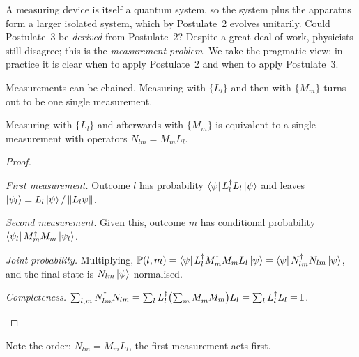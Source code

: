 \begin{remark}
  A measuring device is itself a quantum system, so the system plus the apparatus form a larger isolated system, which by Postulate~2 evolves unitarily. Could Postulate~3 be \emph{derived} from Postulate~2? Despite a great deal of work, physicists still disagree; this is the \emph{measurement problem}. We take the pragmatic view: in practice it is clear when to apply Postulate~2 and when to apply Postulate~3.
\end{remark}

Measurements can be chained. Measuring with $\{L_l\}$ and then with $\{M_m\}$ turns out to be one single measurement.

\begin{proposition}\label{prop:cascade}
  Measuring with $\{L_l\}$ and afterwards with $\{M_m\}$ is equivalent to a single measurement with operators $N_{lm}=M_mL_l$.
\end{proposition}
\begin{proof}
  \begin{steps}
    \item \emph{First measurement.} Outcome $l$ has probability $\left\langle\psi\right| L_l^\dagger L_l\left|\psi\right\rangle$ and leaves $\left|\psi_l\right\rangle=L_l\left|\psi\right\rangle/\left\|L_l\psi\right\|$.
    \item \emph{Second measurement.} Given this, outcome $m$ has conditional probability $\left\langle\psi_l\right|M_m^\dagger M_m\left|\psi_l\right\rangle$.
    \item \emph{Joint probability.} Multiplying, $\mathbb{P}(l,m)=\left\langle\psi\right| L_l^\dagger M_m^\dagger M_mL_l\left|\psi\right\rangle=\left\langle\psi\right| N_{lm}^\dagger N_{lm}\left|\psi\right\rangle$, and the final state is $N_{lm}\left|\psi\right\rangle$ normalised.
    \item \emph{Completeness.} $\sum_{l,m}N_{lm}^\dagger N_{lm}=\sum_lL_l^\dagger\bigl(\sum_mM_m^\dagger M_m\bigr)L_l=\sum_lL_l^\dagger L_l=\mathbb{I}$. \qedhere
  \end{steps}
\end{proof}

Note the order: $N_{lm}=M_mL_l$, the first measurement acts first.

